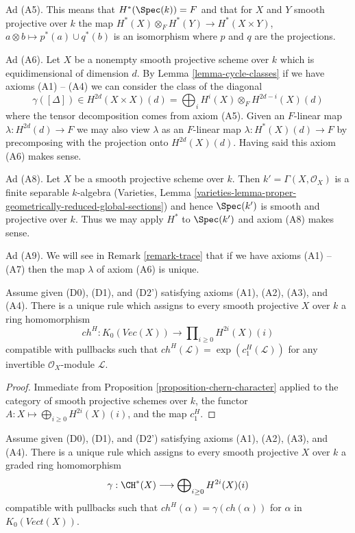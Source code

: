 \medskip\noindent
Ad (A5). This means that $H^*(\Spec(k)) = F$ and that for $X$ and $Y$ smooth
projective over $k$ the map $H^*(X) \otimes_F H^*(Y) \to H^*(X \times Y)$,
$a \otimes b \mapsto p^*(a) \cup q^*(b)$ is an isomorphism
where $p$ and $q$ are the projections.

\medskip\noindent
Ad (A6). Let $X$ be a nonempty smooth projective scheme over $k$
which is equidimensional of dimension $d$. By Lemma \ref{lemma-cycle-classes}
if we have axioms (A1) -- (A4) we can consider the class of the diagonal
$$
\gamma([\Delta]) \in
H^{2d}(X \times X)(d) = \bigoplus\nolimits_i H^i(X) \otimes_F H^{2d - i}(X)(d)
$$
where the tensor decomposition comes from axiom (A5).
Given an $F$-linear map $\lambda : H^{2d}(d) \to F$ we may also view
$\lambda$ as an $F$-linear map $\lambda : H^*(X)(d) \to F$ by precomposing
with the projection onto $H^{2d}(X)(d)$. Having said this axiom (A6)
makes sense.

\medskip\noindent
Ad (A8). Let $X$ be a smooth projective scheme over $k$.
Then $k' = \Gamma(X, \mathcal{O}_X)$ is a finite separable
$k$-algebra (Varieties, Lemma
\ref{varieties-lemma-proper-geometrically-reduced-global-sections})
and hence $\Spec(k')$ is smooth and projective over $k$.
Thus we may apply $H^*$ to $\Spec(k')$ and axiom (A8) makes sense.

\medskip\noindent
Ad (A9). We will see in Remark \ref{remark-trace} that if we have
axioms (A1) -- (A7) then the map $\lambda$ of axiom (A6) is unique.

\begin{lemma}
\label{lemma-chern-classes}
Assume given (D0), (D1), and (D2') satisfying axioms (A1), (A2), (A3), and (A4).
There is a unique rule which assigns to every smooth projective $X$ over $k$
a ring homomorphism
$$
ch^H :
K_0(\textit{Vec}(X))
\longrightarrow
\prod\nolimits_{i \geq 0} H^{2i}(X)(i)
$$
compatible with pullbacks such that
$ch^H(\mathcal{L}) = \exp(c_1^H(\mathcal{L}))$
for any invertible $\mathcal{O}_X$-module $\mathcal{L}$.
\end{lemma}

\begin{proof}
Immediate from Proposition \ref{proposition-chern-character}
applied to the category of smooth projective schemes over $k$,
the functor $A : X \mapsto \bigoplus_{i \geq 0} H^{2i}(X)(i)$,
and the map $c_1^H$.
\end{proof}

\begin{lemma}
\label{lemma-cycle-classes}
Assume given (D0), (D1), and (D2') satisfying axioms (A1), (A2), (A3), and (A4).
There is a unique rule which assigns to every smooth projective $X$ over $k$
a graded ring homomorphism
$$
\gamma : \CH^*(X) \longrightarrow \bigoplus\nolimits_{i \geq 0} H^{2i}(X)(i)
$$
compatible with pullbacks such that $ch^H(\alpha) = \gamma(ch(\alpha))$
for $\alpha$ in $K_0(\textit{Vect}(X))$.
\end{lemma}

